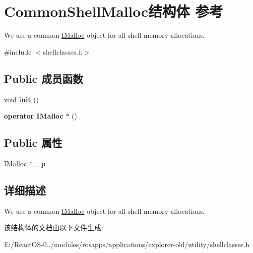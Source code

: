 \hypertarget{struct_common_shell_malloc}{}\section{Common\+Shell\+Malloc结构体 参考}
\label{struct_common_shell_malloc}


We use a common \hyperlink{interface_i_malloc}{I\+Malloc} object for all shell memory allocations.  




{\ttfamily \#include $<$shellclasses.\+h$>$}

\subsection*{Public 成员函数}
\begin{DoxyCompactItemize}
\item 
\mbox{\label{struct_common_shell_malloc_a46be207ea11d71698988df55b5bd3e32}} 
\hyperlink{interfacevoid}{void} {\bfseries init} ()
\item 
\mbox{\label{struct_common_shell_malloc_a12ef03c76892077d89ad1db48f08fdad}} 
{\bfseries operator I\+Malloc $\ast$} ()
\end{DoxyCompactItemize}
\subsection*{Public 属性}
\begin{DoxyCompactItemize}
\item 
\mbox{\label{struct_common_shell_malloc_a8cf4e1ec1f46b46f377cc658c6ea717d}} 
\hyperlink{interface_i_malloc}{I\+Malloc} $\ast$ {\bfseries \+\_\+p}
\end{DoxyCompactItemize}


\subsection{详细描述}
We use a common \hyperlink{interface_i_malloc}{I\+Malloc} object for all shell memory allocations. 

该结构体的文档由以下文件生成\+:\begin{DoxyCompactItemize}
\item 
E\+:/\+React\+O\+S-\/0../modules/rosapps/applications/explorer-\/old/utility/shellclasses.\+h\end{DoxyCompactItemize}
